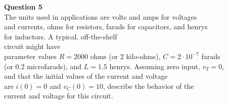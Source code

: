 \documentclass[preview]{standalone}
\begin{document}
\begin{center}
\raggedright
                    \textbf{Question 5}\\
                    The units used in applications are volts and amps for voltages \\ 
                    and currents, ohms for resistors, farads for capacitors, and henrys \\
                    for inductors. A typical, off-the-shelf \\ circuit might have \\
                    parameter values $R = 2000$ ohms (or 2 kilo-ohms), $C = 2 · 10^{-7}$  farads \\
                     (or 0.2 microfarads), and $L = 1.5$ henrys. Assuming zero input, $v_T = 0$, \\
                    and that the initial values of the current and voltage \\
                    are $i(0) = 0$ and $v_C(0) = 10$, describe the behavior of the \\
                    current and voltage for this circuit.
\end{center}
\end{document}
